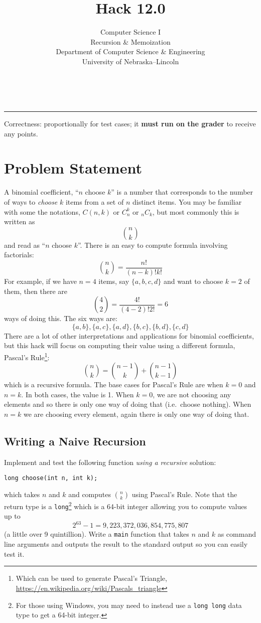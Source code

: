 \documentclass[12pt]{scrartcl}
\title{Hack 12.0}\let\Title\@title
\subtitle{Computer Science I\\
Recursion \& Memoization\\
{\small
\vskip1cm
Department of Computer Science \& Engineering \\
University of Nebraska--Lincoln}
\vskip-3cm}
\date{~}
\begin{document}
\maketitle

\hrule



Correctness: proportionally for test cases; it \textbf{must run on the grader} to
receive any points.


\section*{Problem Statement}

A binomial coefficient, ``$n$ choose $k$'' is a number that corresponds 
to the number of ways to \emph{choose} $k$ items from a set of $n$ distinct
items.  You may be familiar with some the notations, $C(n,k)$ or $C_n^k$ 
or ${}_{n}C_k $, but most commonly this is written as 
  $${n \choose k}$$
and read as ``$n$ choose $k$''.  There is an easy to compute formula involving
factorials:
  $${n \choose k} = \frac{n!}{(n-k)!k!}$$
For example, if we have $n = 4$ items, say $\{a, b, c, d\}$ and want to choose
$k=2$ of them, then there are 
  $${4 \choose 2} = \frac{4!}{(4-2)!2!} = 6$$
ways of doing this.  The six ways are:
  $$\{a, b\}, \{a, c\}, \{a, d\}, \{b, c\}, \{b, d\}, \{c, d\}$$
There are a lot of other interpretations and applications for binomial 
coefficients, but this hack will focus on computing their value using
a different formula, Pascal's Rule\footnote{Which can be used to generate
Pascal's Triangle, \url{https://en.wikipedia.org/wiki/Pascals_triangle}}:
  $${n \choose k} = {n-1 \choose k} + {n-1 \choose k-1}$$
which is a recursive formula.  The base cases for Pascal's Rule are when
$k = 0$ and $n = k$.  In both cases, the value is 1.  When $k = 0$, we are
not choosing any elements and so there is only one way of doing that (i.e.\
choose nothing).  When $n = k$ we are choosing every element, again there
is only one way of doing that.  

\subsection*{Writing a Naive Recursion}

Implement and test the following function \emph{using a recursive} 
solution:

\texttt{long choose(int n, int k);}

which takes $n$ and $k$ and computes ${n\choose k}$ using Pascal's Rule.
Note that the return type is a \texttt{long}\footnote{For those
using Windows, you may need to instead use a \texttt{long long}
data type to get a 64-bit integer.} which is a 64-bit
integer allowing you to compute values up to 
  $$2^{63}-1 = 9,223,372,036,854,775,807$$
(a little over 9 quintillion).  Write a \texttt{main} function
that takes $n$ and $k$ as command line arguments and outputs the result
to the standard output so you can easily test it.
\end{document}

